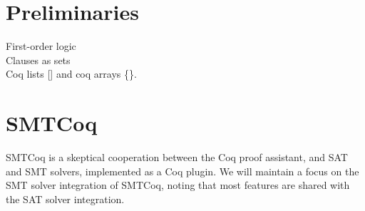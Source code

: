 \documentclass{article}
\begin{document}
	\section{Preliminaries}
	\label{sec:prelims}
	First-order logic\\
	Clauses as sets\\
	Coq lists [] and coq arrays \{\}.
	
	\section{SMTCoq}
	\label{sec:smtcoq}
	SMTCoq is a skeptical cooperation 
	between the Coq proof assistant, and 
	SAT and SMT solvers, implemented as a 
	Coq plugin. We will maintain a focus 
	on the SMT solver integration of 
	SMTCoq, noting that most features are 
	shared with the SAT	solver integration.
	
\end{document}

